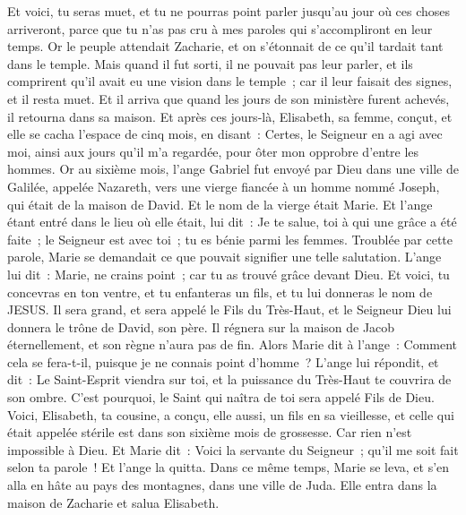 \begin{multicols}{2}
Et voici, tu seras muet, et tu ne pourras point parler jusqu'au jour où ces choses arriveront, parce que tu n'as pas cru à mes paroles qui s'accompliront en leur temps.
Or le peuple attendait Zacharie, et on s'étonnait de ce qu'il tardait tant dans le temple.
Mais quand il fut sorti, il ne pouvait pas leur parler, et ils comprirent qu'il avait eu une vision dans le temple~; car il leur faisait des signes, et il resta muet.
Et il arriva que quand les jours de son ministère furent achevés, il retourna dans sa maison.
Et après ces jours-là, Elisabeth, sa femme, conçut, et elle se cacha l'espace de cinq mois, en disant~:
Certes, le Seigneur en a agi avec moi, ainsi aux jours qu'il m'a regardée, pour ôter mon opprobre d'entre les hommes.
Or au sixième mois, l'ange Gabriel fut envoyé par Dieu dans une ville de Galilée, appelée Nazareth,
vers une vierge fiancée à un homme nommé Joseph, qui était de la maison de David. Et le nom de la vierge était Marie.
Et l'ange étant entré dans le lieu où elle était, lui dit~: Je te salue, toi à qui une grâce a été faite~; le Seigneur est avec toi~; tu es bénie parmi les femmes.
Troublée par cette parole, Marie se demandait ce que pouvait signifier une telle salutation.
L'ange lui dit~: Marie, ne crains point~; car tu as trouvé grâce devant Dieu.
Et voici, tu concevras en ton ventre, et tu enfanteras un fils, et tu lui donneras le nom de JESUS.
Il sera grand, et sera appelé le Fils du Très-Haut, et le Seigneur Dieu lui donnera le trône de David, son père.
Il régnera sur la maison de Jacob éternellement, et son règne n'aura pas de fin.
Alors Marie dit à l'ange~: Comment cela se fera-t-il, puisque je ne connais point d'homme~?
L'ange lui répondit, et dit~: Le Saint-Esprit viendra sur toi, et la puissance du Très-Haut te couvrira de son ombre. C'est pourquoi, le Saint qui naîtra de toi sera appelé Fils de Dieu.
Voici, Elisabeth, ta cousine, a conçu, elle aussi, un fils en sa vieillesse, et celle qui était appelée stérile est dans son sixième mois de grossesse.
Car rien n'est impossible à Dieu.
Et Marie dit~: Voici la servante du Seigneur~; qu'il me soit fait selon ta parole~! Et l'ange la quitta.
Dans ce même temps, Marie se leva, et s'en alla en hâte au pays des montagnes, dans une ville de Juda.
Elle entra dans la maison de Zacharie et salua Elisabeth.

\end{multicols}
